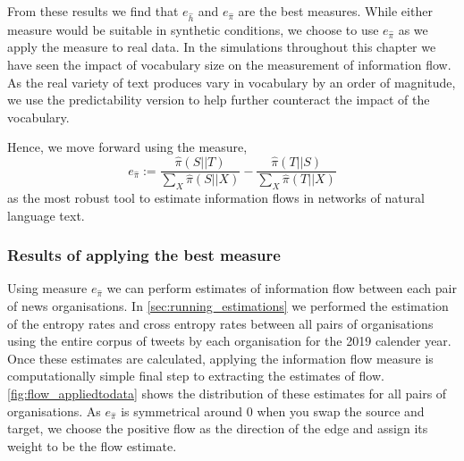 From these results we find that $e_{\hat{h}}$ and $e_{\hat{\pi}}$ are the best measures. While either measure would be suitable in synthetic conditions, we choose to use $e_{\hat{\pi}}$ as we apply the measure to real data. In the simulations throughout this chapter we have seen the impact of vocabulary size on the measurement of information flow. As the real variety of text produces vary in vocabulary by an order of magnitude, we use the predictability version to help further counteract the impact of the vocabulary. 

Hence, we move forward using the measure,
\begin{equation} 
e_{\hat{\pi}} := \frac{\hat{\pi}(S||T)}{\sum_X \hat{\pi}(S||X)} - \frac{\hat{\pi}(T||S)}{\sum_X \hat{\pi}(T||X)}
\end{equation}
as the most robust tool to estimate information flows in networks of natural language text. 

\subsubsection{Results of applying the best measure}

Using measure $e_{\hat{\pi}}$ we can perform estimates of information flow between each pair of news organisations. In \autoref{sec:running_estimations} we performed the estimation of the entropy rates and cross entropy rates between all pairs of organisations using the entire corpus of tweets by each organisation for the 2019 calender year. Once these estimates are calculated, applying the information flow measure is computationally simple final step to extracting the estimates of flow. \autoref{fig:flow_appliedtodata} shows the distribution of these estimates for all pairs of organisations. As $e_{\hat{\pi}}$ is symmetrical around 0 when you swap the source and target, we choose the positive flow as the direction of the edge and assign its weight to be the flow estimate.


